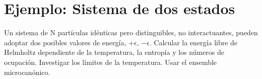 \section{Ejemplo: Sistema de dos estados}
Un sistema de N partículas idénticas pero distinguibles, no interactuantes, pueden adoptar dos posibles valores de energía, $+\epsilon$, $-\epsilon$. Calcular la energía libre de Helmholtz dependiente de la temperatura, la entropía y los números de ocupación. Investigar los límites de la temperatura. Usar el ensemble microcanónico.
